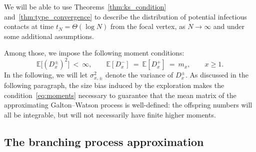 \begin{refsegment}
We will be able to use Theorems~\ref{thm:ks_condition}
and~\ref{thm:type_convergence} to describe the distribution of
potential infectious contacts at time $t_N=\Theta(\log N)$ from the
focal vertex, as $N\to \infty$ and under some additional assumptions.

Among those, we impose the following moment conditions:
\begin{equation}\label{eq:moments}
  \mathbb{E}\big[(D^{\pm}_x)^2\big]\ <\ \infty,\qquad
  \mathbb{E}[D_x^-]\ =\ \mathbb{E}[D_x^+]\ =\ m_x, \qquad
  x\geq 1.
\end{equation}
In the following, we will let $\sigma_{x,\pm}^2$ denote the variance
of $D_x^{\pm}$. As discussed in the following paragraph, the
  size bias induced by the exploration makes the
  condition~\eqref{eq:moments} necessary to guarantee that the mean
  matrix of the approximating Galton--Watson process is well-defined:
  the offspring numbers will all be integrable, but will
  not necessarily have finite higher moments.

\subsection*{The branching process approximation}


\end{refsegment}

